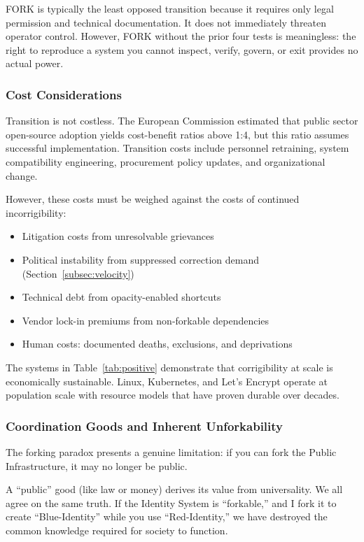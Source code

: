 \documentclass{article}
\begin{document}
FORK is typically the least opposed transition because it requires only legal permission and technical documentation. It does not immediately threaten operator control. However, FORK without the prior four tests is meaningless: the right to reproduce a system you cannot inspect, verify, govern, or exit provides no actual power.

\subsubsection{Cost Considerations}

Transition is not costless. The European Commission \citep{eu2021oss} estimated that public sector open-source adoption yields cost-benefit ratios above 1:4, but this ratio assumes successful implementation. Transition costs include personnel retraining, system compatibility engineering, procurement policy updates, and organizational change.

However, these costs must be weighed against the costs of continued incorrigibility:

\begin{itemize}
    \item Litigation costs from unresolvable grievances
    \item Political instability from suppressed correction demand (Section~\ref{subsec:velocity})
    \item Technical debt from opacity-enabled shortcuts
    \item Vendor lock-in premiums from non-forkable dependencies
    \item Human costs: documented deaths, exclusions, and deprivations
\end{itemize}

The systems in Table~\ref{tab:positive} demonstrate that corrigibility at scale is economically sustainable. Linux, Kubernetes, and Let's Encrypt operate at population scale with resource models that have proven durable over decades.

\subsubsection{Coordination Goods and Inherent Unforkability}
\label{subsec:coordination}

The forking paradox presents a genuine limitation: if you can fork the Public Infrastructure, it may no longer be public.

A ``public'' good (like law or money) derives its value from universality. We all agree on the same truth. If the Identity System is ``forkable,'' and I fork it to create ``Blue-Identity'' while you use ``Red-Identity,'' we have destroyed the common knowledge required for society to function.
\end{document}
